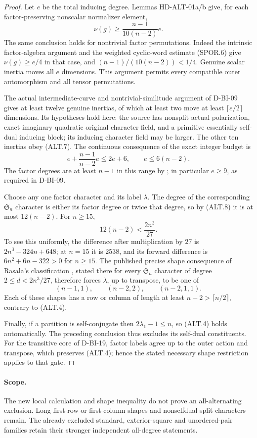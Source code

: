 \begin{proof}
Let $e$ be the total inducing degree.  Lemmas HD-ALT-01a/b give,
for each factor-preserving nonscalar normalizer element,
\[
        \nu(g)\ge\frac{n-1}{10(n-2)}e.                   \tag{ALT.7}
\]
The same conclusion holds for nontrivial factor permutations.
Indeed the intrinsic factor-algebra argument and the weighted
cyclic-word estimate (SPOR.6) give $\nu(g)\ge e/4$ in that
case, and $(n-1)/(10(n-2))<1/4$.  Genuine scalar inertia moves
all $e$ dimensions.  This argument permits every compatible
outer automorphism and all tensor permutations.

The actual intermediate-curve and nontrivial-similitude argument
of D-BI-09 gives at least twelve genuine inertias, of which at
least two move at least $\lceil e/2\rceil$ dimensions.  Its
hypotheses hold here: the source has nonsplit actual polarization,
exact imaginary quadratic original character field, and a
primitive essentially self-dual inducing block; its inducing
character field may be larger.  The other ten inertias obey
(ALT.7).  The continuous consequence of the exact integer
budget is
\[
 e+\frac{n-1}{n-2}e\le2e+6,
                    \qquad e\le6(n-2).                  \tag{ALT.8}
\]
The factor degrees are at least $n-1$ in this range by
\cite[Lemmas~3.1--3.2, p.~607]{HD:BNOT2015}; in particular
$e\ge9$, as required in D-BI-09.

Choose any one factor character and its label $\lambda$.
The degree of the corresponding $\mathfrak S_n$ character
is either its factor degree or twice that degree, so by (ALT.8)
it is at most $12(n-2)$.  For $n\ge15$,
\[
       12(n-2)<\frac{2n^3}{27}.
\]
To see this uniformly, the difference after multiplication by
$27$ is $2n^3-324n+648$; at $n=15$ it is $2538$, and its forward
difference is $6n^2+6n-322>0$ for $n\ge15$.
The published precise shape consequence of Rasala's classification
\cite[proof of Theorem~9.7, p.~312]{HD:GKT2019}, stated there
for every $\mathfrak S_n$ character of degree
$2\le d<2n^3/27$, therefore forces $\lambda$, up to transpose,
to be one of
\[
             (n-1,1),\qquad(n-2,2),\qquad(n-2,1,1).
\]
Each of these shapes has a row or column of length at least
$n-2>\lceil n/2\rceil$, contrary to (ALT.4).

Finally, if a partition is self-conjugate then
$2\lambda_1-1\le n$, so (ALT.4) holds automatically.
The preceding conclusion thus excludes its self-dual constituents.
For the transitive core of D-BI-19, factor labels agree up to the
outer action and transpose, which preserves (ALT.4); hence the
stated necessary shape restriction applies to that gate.
\end{proof}

\paragraph{Scope.}
The new local calculation and shape inequality do not prove
an all-alternating exclusion.  Long first-row or first-column
shapes and nonselfdual split characters remain.  The already
excluded standard, exterior-square and unordered-pair families
retain their stronger independent all-degree statements.
